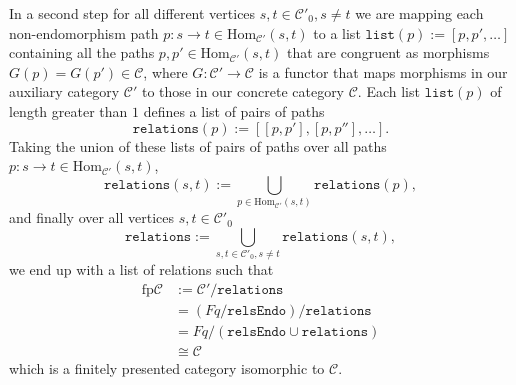 \begin{remark}
In a second step for all different vertices $s, t \in \mathcal{C}'_{0}, s \neq t$ we are mapping each non-endomorphism path 
$p : s \rightarrow t \in \mathrm{Hom}_{\mathcal{C}'}(s,t)$ to a list $\mathtt{list}(p) := [ p, p', \dots ]$ containing all the paths
$p, p' \in \mathrm{Hom}_{\mathcal{C}'}(s,t)$ that are congruent as morphisms $G(p) = G(p') \in \mathcal{C}$,
where $G : \mathcal{C}' \rightarrow \mathcal{C}$ is a functor that maps morphisms in our auxiliary category $\mathcal{C}'$ to
those in our concrete category $\mathcal{C}$.
Each list $\mathtt{list}(p)$ of length greater than $1$ defines a list of pairs of paths
\begin{equation*}
\mathtt{relations}(p) := [ [ p, p' ], [ p, p'' ], \dots ].
\end{equation*}
Taking the union of these lists of pairs of paths over all paths $p : s \rightarrow t \in \mathrm{Hom}_{\mathcal{C}'}(s,t)$,
\begin{equation*}
\mathtt{relations}(s,t) := \bigcup_{p \in \mathrm{Hom}_{\mathcal{C}'}(s,t)} \mathtt{relations}(p),
\end{equation*}
and finally over all vertices $s, t \in \mathcal{C}'_{0}$
\begin{equation*}
\mathtt{relations} := \bigcup_{s, t \in \mathcal{C}'_{0}, s \neq t} \mathtt{relations}(s,t),
\end{equation*}
we end up with a list of relations such that
\begin{align*}
\text{fp}\mathcal{C} &:= \mathcal{C}' / \mathtt{relations} \\
 &= (Fq / \mathtt{relsEndo}) / \mathtt{relations} \\
 &= Fq / (\mathtt{relsEndo} \cup \mathtt{relations}) \\
 &\cong \mathcal{C}
\end{align*}
which is a finitely presented category isomorphic to $\mathcal{C}$.
\end{remark}

